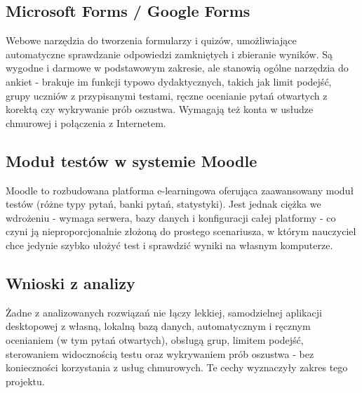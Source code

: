 \subsection{Microsoft Forms / Google Forms}

Webowe narzędzia do tworzenia formularzy i quizów, umożliwiające automatyczne sprawdzanie odpowiedzi
zamkniętych i zbieranie wyników. Są wygodne i darmowe w podstawowym zakresie, ale stanowią ogólne
narzędzia do ankiet - brakuje im funkcji typowo dydaktycznych, takich jak limit podejść, grupy
uczniów z przypisanymi testami, ręczne ocenianie pytań otwartych z korektą czy wykrywanie prób
oszustwa. Wymagają też konta w usłudze chmurowej i połączenia z Internetem.

\subsection{Moduł testów w systemie Moodle}

Moodle to rozbudowana platforma e-learningowa oferująca zaawansowany moduł testów (różne typy pytań,
banki pytań, statystyki). Jest jednak ciężka we wdrożeniu - wymaga serwera, bazy danych i konfiguracji
całej platformy - co czyni ją nieproporcjonalnie złożoną do prostego scenariusza, w którym nauczyciel
chce jedynie szybko ułożyć test i sprawdzić wyniki na własnym komputerze.

\subsection{Wnioski z analizy}

Żadne z analizowanych rozwiązań nie łączy lekkiej, samodzielnej aplikacji desktopowej z własną,
lokalną bazą danych, automatycznym i ręcznym ocenianiem (w tym pytań otwartych), obsługą grup,
limitem podejść, sterowaniem widocznością testu oraz wykrywaniem prób oszustwa - bez konieczności
korzystania z usług chmurowych. Te cechy wyznaczyły zakres tego projektu.
